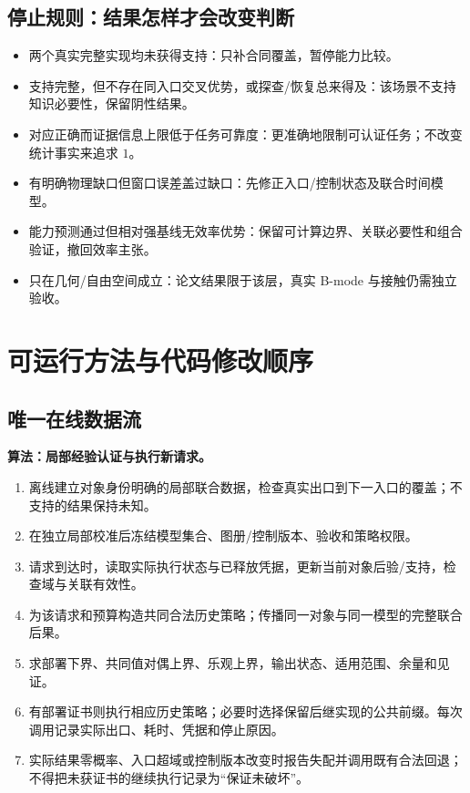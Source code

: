 \documentclass[11pt,a4paper,fontset=fandol]{ctexart}
\theoremstyle{definition}
\theoremstyle{remark}\newtheorem{remark}[theorem]{说明}
\numberwithin{equation}{section}
\begin{document}
\subsection{停止规则：结果怎样才会改变判断}
\begin{itemize}
\item 两个真实完整实现均未获得支持：只补合同覆盖，暂停能力比较。
\item 支持完整，但不存在同入口交叉优势，或探查/恢复总来得及：该场景不支持知识必要性，保留阴性结果。
\item 对应正确而证据信息上限低于任务可靠度：更准确地限制可认证任务；不改变统计事实来追求 $1$。
\item 有明确物理缺口但窗口误差盖过缺口：先修正入口/控制状态及联合时间模型。
\item 能力预测通过但相对强基线无效率优势：保留可计算边界、关联必要性和组合验证，撤回效率主张。
\item 只在几何/自由空间成立：论文结果限于该层，真实 B-mode 与接触仍需独立验收。
\end{itemize}

\section{可运行方法与代码修改顺序}
\label{sec:implementation}
\subsection{唯一在线数据流}
\begin{corebox}
\textbf{算法：局部经验认证与执行新请求。}
\begin{enumerate}
\item 离线建立对象身份明确的局部联合数据，检查真实出口到下一入口的覆盖；不支持的结果保持未知。
\item 在独立局部校准后冻结模型集合、图册/控制版本、验收和策略权限。
\item 请求到达时，读取实际执行状态与已释放凭据，更新当前对象后验/支持，检查域与关联有效性。
\item 为该请求和预算构造共同合法历史策略；传播同一对象与同一模型的完整联合后果。
\item 求部署下界、共同值对偶上界、乐观上界，输出状态、适用范围、余量和见证。
\item 有部署证书则执行相应历史策略；必要时选择保留后继实现的公共前缀。每次调用记录实际出口、耗时、凭据和停止原因。
\item 实际结果零概率、入口超域或控制版本改变时报告失配并调用既有合法回退；不得把未获证书的继续执行记录为“保证未破坏”。
\end{enumerate}
\end{corebox}
\end{document}
